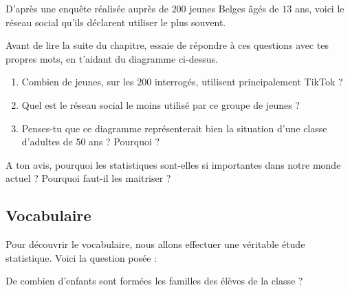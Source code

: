 \documentclass[../../syllabus_1.tex]{subfiles}
\begin{document}
D'après une enquête réalisée auprès de $200$ jeunes Belges âgés de $13$ ans, voici le réseau social qu'ils déclarent utiliser le plus souvent.

\begin{center}
\end{center}

Avant de lire la suite du chapitre, essaie de répondre à ces questions avec tes propres mots, en t'aidant du diagramme ci-dessus.
\begin{enumerate}[itemsep=0.8cm]
    \item Combien de jeunes, sur les $200$ interrogés, utilisent principalement TikTok ?
    \item Quel est le réseau social le moins utilisé par ce groupe de jeunes ?
    \item Penses-tu que ce diagramme représenterait bien la situation d'une classe d'adultes de $50$ ans ? Pourquoi ?
\end{enumerate}

\vspace{3cm}
A ton avis, pourquoi les statistiques sont-elles si importantes dans notre monde actuel ? Pourquoi faut-il les maitriser ?

\newpage
\subsection{Vocabulaire}
Pour découvrir le vocabulaire, nous allons effectuer une véritable étude statistique. Voici la question posée : 

De combien d'enfants sont formées les familles des élèves de la classe ?
\end{document}
